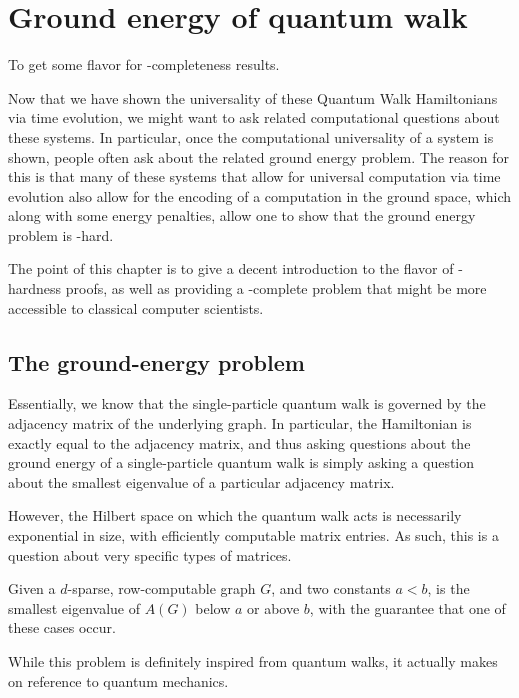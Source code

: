 \documentclass[../thesis-main/thesis-main]{subfiles}
\begin{document}
\chapter{Ground energy of quantum walk}
\label{chap:SP_ground}

To get some flavor for \QMA-completeness results.

Now that we have shown the universality of these Quantum Walk Hamiltonians via time evolution, we might want to ask related computational questions about these systems.  In particular, once the computational universality of a system is shown, people often ask about the related ground energy problem.  The reason for this is that many of these systems that allow for universal computation via time evolution also allow for the encoding of a computation in the ground space, which along with some energy penalties, allow one to show that the ground energy problem is \QMA-hard. 

The point of this chapter is to give a decent introduction to the flavor of \QMA-hardness proofs, as well as providing a \QMA-complete problem that might be more accessible to classical computer scientists.

\section{The ground-energy problem}

Essentially, we know that the single-particle quantum walk is governed by the adjacency matrix of the underlying graph.  In particular, the Hamiltonian is exactly equal to the adjacency matrix, and thus asking questions about the ground energy of a single-particle quantum walk is simply asking a question about the smallest eigenvalue of a particular adjacency matrix.

However, the Hilbert space on which the quantum walk acts is necessarily exponential in size, with efficiently computable matrix entries.  As such, this is a question about very specific types of matrices.

\begin{problem} Given a $d$-sparse, row-computable graph $G$, and two constants $a< b$, is the smallest eigenvalue of $A(G)$ below $a$ or above $b$, with the guarantee that one of these cases occur.
\end{problem}

While this problem is definitely inspired from quantum walks, it actually makes on reference to quantum mechanics.
\end{document}

